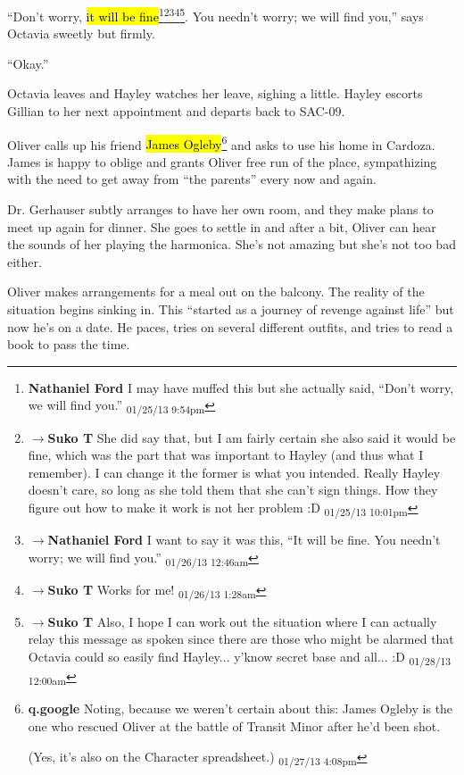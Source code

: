``Don't worry, \hl{it will be fine}\footnote{\textbf{Nathaniel Ford }I may have muffed this but she actually said, ``Don't worry, we will find you.'' \textsubscript{01/25/13 9:54pm}}\footnote{$\rightarrow$\textbf{Suko T }She did say that, but I am fairly certain she also said it would be fine, which was the part that was important to Hayley (and thus what I remember).  I can change it the former is what you intended.  Really Hayley doesn't care, so long as she told them that she can't sign things.  How they figure out how to make it work is not her problem :D \textsubscript{01/25/13 10:01pm}}\footnote{$\rightarrow$\textbf{Nathaniel Ford }I want to say it was this, ``It will be fine. You needn't worry; we will find you.'' \textsubscript{01/26/13 12:46am}}\footnote{$\rightarrow$\textbf{Suko T }Works for me! \textsubscript{01/26/13 1:28am}}\footnote{$\rightarrow$\textbf{Suko T }Also, I hope I can work out the situation where I can actually relay this message as spoken since there are those who might be alarmed that Octavia could so easily find Hayley... y'know secret base and all... :D \textsubscript{01/28/13 12:00am}}. You needn't worry; we will find you,'' says Octavia sweetly but firmly.

``Okay.''



Octavia leaves and Hayley watches her leave, sighing a little.  Hayley escorts Gillian to her next appointment and departs back to SAC-09.



Oliver calls up his friend \hl{James Ogleby}\footnote{\textbf{q.google }Noting, because we weren't certain about this: James Ogleby is the one who rescued Oliver at the battle of Transit Minor after he'd been shot.

(Yes, it's also on the Character spreadsheet.) \textsubscript{01/27/13 4:08pm}} and asks to use his home in Cardoza.  James is happy to oblige and grants Oliver free run of the place, sympathizing with the need to get away from ``the parents'' every now and again.



Dr. Gerhauser subtly arranges to have her own room, and they make plans to meet up again for dinner.  She goes to settle in and after a bit, Oliver can hear the sounds of her playing the harmonica.  She's not amazing but she's not too bad either.  



Oliver makes arrangements for a meal out on the balcony.  The reality of the situation begins sinking in.  This ``started as a journey of revenge against life'' but now he's on a date.  He paces, tries on several different outfits, and tries to read a book to pass the time.  



